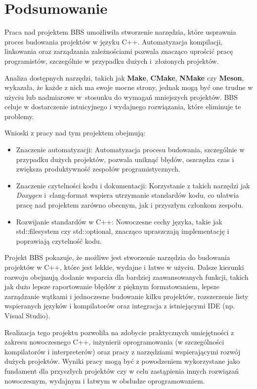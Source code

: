 \chapter{Podsumowanie}
Praca nad projektem BBS umożliwiła stworzenie narzędzia, które usprawnia proces budowania projektów w języku C++. Automatyzacja kompilacji, linkowania oraz zarządzania zależnościami pozwala znacząco uprościć pracę programistów, szczególnie w przypadku dużych i~złożonych projektów.

Analiza dostępnych narzędzi, takich jak \textbf{Make}, \textbf{CMake}, \textbf{NMake} czy \textbf{Meson}, wykazała, że każde z nich ma swoje mocne strony, jednak mogą być one trudne w użyciu lub nadmiarowe w~stosunku do wymagań mniejszych projektów. BBS celuje w dostarczenie intuicyjnego i wydajnego rozwiązania, które eliminuje te problemy.

Wnioski z pracy nad tym projektem obejmują:
\begin{itemize}
    \item Znaczenie automatyzacji: Automatyzacja procesu budowania, szczególnie w przypadku dużych projektów, pozwala uniknąć błędów, oszczędza czas i zwiększa produktywność zespołów programistycznych.
    \item Znaczenie czytelności kodu i dokumentacji: Korzystanie z takich narzędzi jak \textit{Doxygen} i~clang-format wspiera utrzymanie standardów kodu, co ułatwia pracę nad projektem zarówno obecnym, jak i przyszłym członkom zespołu.
    \item Rozwijanie standardów w C++: Nowoczesne cechy języka, takie jak std::filesystem czy std::optional, znacząco upraszczają implementację i poprawiają czytelność kodu.
\end{itemize}

Projekt BBS pokazuje, że możliwe jest stworzenie narzędzia do budowania projektów w C++, które jest lekkie, wydajne i łatwe w użyciu. Dalsze kierunki rozwoju obejmują dodanie wsparcia dla bardziej zaawansowanych funkcji, takich jak dużo lepsze raportowanie błędów z pięknym formatowaniem, lepsze zarządzanie wątkami i jednoczesne budowanie kilku projektów, rozszerzenie listy wspieranych języków i kompilatorów oraz integracja z istniejącymi IDE (np. Visual Studio).

Realizacja tego projektu pozwoliła na zdobycie praktycznych umiejętności z zakresu nowoczesnego C++, inżynierii oprogramowania (w szczególności kompilatorów i interpreterów) oraz pracy z narzędziami wspierającymi rozwój dużych projektów. Wyniki pracy mogą być z powodzeniem wykorzystane jako fundament dla przyszłych projektów czy w celu zastąpienia innych rozwiązań nowoczesnym, wydajnym i łatwym w obsłudze oprogramowaniem.